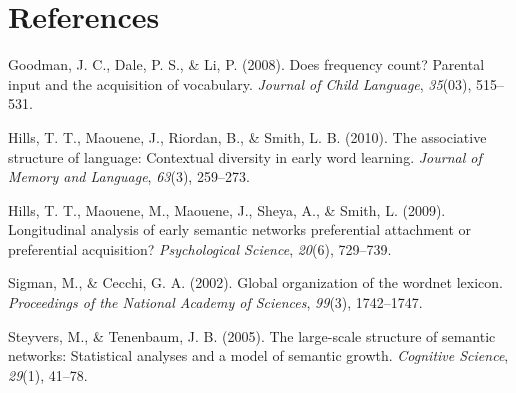 \documentclass[man,floatsintext]{apa6}
\begin{document}
\newpage

\hypertarget{references}{%
\section{References}\label{references}}

\begingroup
\setlength{\parindent}{-0.5in}
\setlength{\leftskip}{0.5in}

\hypertarget{refs}{}
\leavevmode\hypertarget{ref-goodman2008frequency}{}%
Goodman, J. C., Dale, P. S., \& Li, P. (2008). Does frequency count? Parental input and the acquisition of vocabulary. \emph{Journal of Child Language}, \emph{35}(03), 515--531.

\leavevmode\hypertarget{ref-hills2010associative}{}%
Hills, T. T., Maouene, J., Riordan, B., \& Smith, L. B. (2010). The associative structure of language: Contextual diversity in early word learning. \emph{Journal of Memory and Language}, \emph{63}(3), 259--273.

\leavevmode\hypertarget{ref-hills2009longitudinal}{}%
Hills, T. T., Maouene, M., Maouene, J., Sheya, A., \& Smith, L. (2009). Longitudinal analysis of early semantic networks preferential attachment or preferential acquisition? \emph{Psychological Science}, \emph{20}(6), 729--739.

\leavevmode\hypertarget{ref-sigman2002global}{}%
Sigman, M., \& Cecchi, G. A. (2002). Global organization of the wordnet lexicon. \emph{Proceedings of the National Academy of Sciences}, \emph{99}(3), 1742--1747.

\leavevmode\hypertarget{ref-tenenbaum2005large}{}%
Steyvers, M., \& Tenenbaum, J. B. (2005). The large-scale structure of semantic networks: Statistical analyses and a model of semantic growth. \emph{Cognitive Science}, \emph{29}(1), 41--78.

\endgroup
\end{document}
